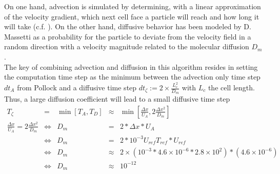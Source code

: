 On one hand, advection is simulated by determining, with a linear approximation of the velocity gradient, which next cell face a particle will reach and how long it will take (c.f. \cite{Pollock1988}).
On the other hand, diffusive behavior has been modeled by D. Massetti as a probability for the particle to deviate from the velocity field in a random direction with a velocity magnitude related to the molecular diffusion $D_m$.\\
The key of combining advection and diffusion in this algorithm resides in setting the computation time step as the minimum between the advection only time step $dt_A$ from Pollock and a diffusive time step $dt_\zeta:=2\times\frac{L_c^2}{D_m}$ with $L_c$ the cell length.
Thus, a large diffusion coefficient will lead to a small diffusive time step 
\begin{equation}
\begin{array}{ccccc}
	T_\zeta & = & \min[T_A, T_D] & \approx & \min[\frac{\Delta x}{U_A}, 2\frac{\Delta x^2}{D_m}] \\
	\frac{\Delta x}{U_A} = 2\frac{\Delta x^2}{D_m}  & \Leftrightarrow & D_m & = & 2*\Delta x * U_A \\	 
	& \Leftrightarrow & D_m & = & 2*10^{-3}U_{ref} T_{ref} * U_{ref} \\
	& \Leftrightarrow & D_m & \approx & 2\times(10^{-3}*4.6\times 10^{-6} * 2.8\times 10^{2}) * (4.6\times 10^{-6}) \\
	& \Leftrightarrow & D_m & \approx & 10^{-12}
\end{array}
\end{equation}

